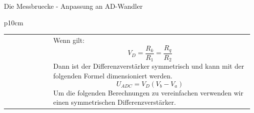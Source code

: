\begin{frame}[t]{Die Messbruecke - Anpassung an AD-Wandler}
\begin{spacing}{0.9}
\begin{tiny}
\begin{table}[h!]
\begin{tabular}{p{10cm} }
                    \begin{tabular}{p{5cm} p{5cm}}
                        \begin{minipage}{0.5\textwidth}
                            \begin{figure}[h!]
                                \scalebox{0.6}{
                                    \centering
                                    \begin{circuitikz}
                                        \draw
                                        (0, 0) node[op amp] (opamp) {}
                                        (opamp.-) to[R,l=$R_1$] (-3, 0.5) to[short,-*,l=$V_a$] ++ (-1,0)
                                        (opamp.+) to[R,l=$R_2$] (-3, -0.5) to[short,-*,l=$V_b$] ++ (-0.5,0)
                                        (opamp.-) to[short] ++(0,1.5) coordinate (leftR)
                                        to[R,l=$R_k$] (leftR -| opamp.out)
                                        to[short] (opamp.out) to[short,-*,l=$U_{ADC}$] ++ (0.5,0)
                                        (opamp.+) to[R,l=$R_q$] (-1.2,-2) node[ground]{};
                                    \end{circuitikz}
                                }
                            \end{figure}
                        \end{minipage}
                         &
                        \begin{minipage}{0.4\textwidth}
                            Wenn gilt:\newline
                            \begin{equation}
                                V_{D} = \frac{R_k}{R_1} = \frac{R_q}{R_2}
                            \end{equation}
                            Dann ist der Differenzverstärker symmetrisch und kann mit der folgenden Formel dimensioniert werden.\newline
                            \begin{equation}
                                U_{ADC}=V_{D}(V_b-V_a)
                            \end{equation}
                            Um die folgenden Berechnungen zu vereinfachen verwenden wir einen symmetrischen Differenzverstärker.
                        \end{minipage}
                    \end{tabular}
                \end{tabular}

            \end{table}

        \end{tiny} \end{spacing}

\end{frame}

